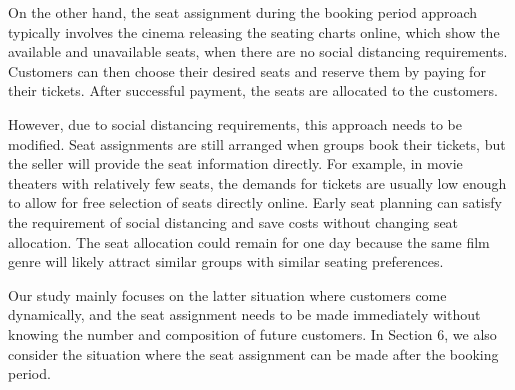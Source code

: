 
On the other hand, the seat assignment during the booking period approach typically involves the cinema releasing the seating charts online, which show the available and unavailable seats, when there are no social distancing requirements. Customers can then choose their desired seats and reserve them by paying for their tickets. After successful payment, the seats are allocated to the customers.

However, due to social distancing requirements, this approach needs to be modified. Seat assignments are still arranged when groups book their tickets, but the seller will provide the seat information directly. For example, in movie theaters with relatively few seats, the demands for tickets are usually low enough to allow for free selection of seats directly online. Early seat planning can satisfy the requirement of social distancing and save costs without changing seat allocation. The seat allocation could remain for one day because the same film genre will likely attract similar groups with similar seating preferences.







Our study mainly focuses on the latter situation where customers come dynamically, and the seat assignment needs to be made immediately without knowing the number and composition of future customers. In Section 6, we also consider the situation where the seat assignment can be made after the booking period. 

